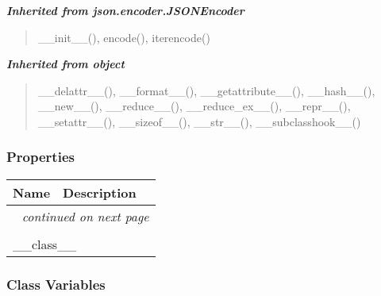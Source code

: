 \large{\textbf{\textit{Inherited from json.encoder.JSONEncoder}}}

\begin{quote}
\_\_init\_\_(), encode(), iterencode()
\end{quote}

\large{\textbf{\textit{Inherited from object}}}

\begin{quote}
\_\_delattr\_\_(), \_\_format\_\_(), \_\_getattribute\_\_(), \_\_hash\_\_(), \_\_new\_\_(), \_\_reduce\_\_(), \_\_reduce\_ex\_\_(), \_\_repr\_\_(), \_\_setattr\_\_(), \_\_sizeof\_\_(), \_\_str\_\_(), \_\_subclasshook\_\_()
\end{quote}


  \subsubsection{Properties}

    \vspace{-1cm}
\hspace{\varindent}\begin{longtable}{|p{\varnamewidth}|p{\vardescrwidth}|l}
\cline{1-2}
\cline{1-2} \centering \textbf{Name} & \centering \textbf{Description}& \\
\cline{1-2}
\endhead\cline{1-2}\multicolumn{3}{r}{\small\textit{continued on next page}}\\\endfoot\cline{1-2}
\endlastfoot\multicolumn{2}{|l|}{\textit{Inherited from object}}\\
\multicolumn{2}{|p{\varwidth}|}{\raggedright \_\_class\_\_}\\
\cline{1-2}
\end{longtable}



  \subsubsection{Class Variables}

